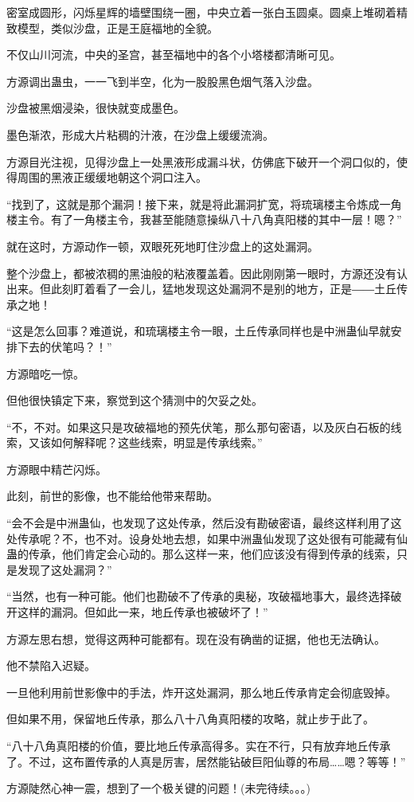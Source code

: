 \begin{this_body}
密室成圆形，闪烁星辉的墙壁围绕一圈，中央立着一张白玉圆桌。圆桌上堆砌着精致模型，类似沙盘，正是王庭福地的全貌。

不仅山川河流，中央的圣宫，甚至福地中的各个小塔楼都清晰可见。

方源调出蛊虫，一一飞到半空，化为一股股黑色烟气落入沙盘。

沙盘被黑烟浸染，很快就变成墨色。

墨色渐浓，形成大片粘稠的汁液，在沙盘上缓缓流淌。

方源目光注视，见得沙盘上一处黑液形成漏斗状，仿佛底下破开一个洞口似的，使得周围的黑液正缓缓地朝这个洞口注入。

“找到了，这就是那个漏洞！接下来，就是将此漏洞扩宽，将琉璃楼主令炼成一角楼主令。有了一角楼主令，我甚至能随意操纵八十八角真阳楼的其中一层！嗯？”

就在这时，方源动作一顿，双眼死死地盯住沙盘上的这处漏洞。

整个沙盘上，都被浓稠的黑油般的粘液覆盖着。因此刚刚第一眼时，方源还没有认出来。但此刻盯着看了一会儿，猛地发现这处漏洞不是别的地方，正是――土丘传承之地！

“这是怎么回事？难道说，和琉璃楼主令一眼，土丘传承同样也是中洲蛊仙早就安排下去的伏笔吗？！”

方源暗吃一惊。

但他很快镇定下来，察觉到这个猜测中的欠妥之处。

“不，不对。如果这只是攻破福地的预先伏笔，那么那句密语，以及灰白石板的线索，又该如何解释呢？这些线索，明显是传承线索。”

方源眼中精芒闪烁。

此刻，前世的影像，也不能给他带来帮助。

“会不会是中洲蛊仙，也发现了这处传承，然后没有勘破密语，最终这样利用了这处传承呢？不，也不对。设身处地去想，如果中洲蛊仙发现了这处很有可能藏有仙蛊的传承，他们肯定会心动的。那么这样一来，他们应该没有得到传承的线索，只是发现了这处漏洞？”

“当然，也有一种可能。他们也勘破不了传承的奥秘，攻破福地事大，最终选择破开这样的漏洞。但如此一来，地丘传承也被破坏了！”

方源左思右想，觉得这两种可能都有。现在没有确凿的证据，他也无法确认。

他不禁陷入迟疑。

一旦他利用前世影像中的手法，炸开这处漏洞，那么地丘传承肯定会彻底毁掉。

但如果不用，保留地丘传承，那么八十八角真阳楼的攻略，就止步于此了。

“八十八角真阳楼的价值，要比地丘传承高得多。实在不行，只有放弃地丘传承了。不过，这布置传承的人真是厉害，居然能钻破巨阳仙尊的布局……嗯？等等！”

方源陡然心神一震，想到了一个极关键的问题！(未完待续。。。)

\end{this_body}


